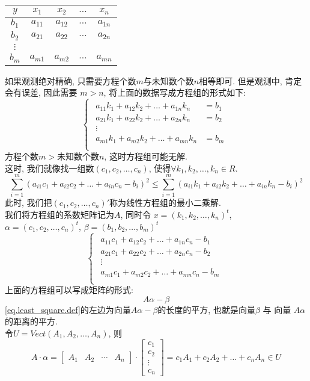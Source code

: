\documentclass{book}
\begin{document}
\begin{center}
\begin{tabular}{c|cccc}
$y$ & $x_1$ & $x_2$ & $\ldots$ & $x_n$ \\ \hline
$b_1$ & $a_{11}$ & $a_{12}$ & $\ldots$ & $a_{1n}$ \\
$b_2$ & $a_{21}$ & $a_{22}$ & $\ldots$ & $a_{2n}$ \\
		$\vdots$ \\
$b_m$ & $a_{m1}$ & $a_{m2}$ & $\ldots$ & $a_{mn}$
\end{tabular}
\end{center}
如果观测绝对精确, 只需要方程个数$m$与未知数个数$n$相等即可.
但是观测中, 肯定会有误差, 因此需要 $m > n$, 将上面的数据写成方程组的形式如下:
$$
\begin{cases}
\begin{aligned}
a_{11} k_1 + a_{12} k_2 + \ldots + a_{1n} k_n & = b_1 \\
a_{21} k_1 + a_{22} k_2 + \ldots + a_{2n} k_n & = b_2 \\
\vdots & \\
a_{m1} k_1 + a_{m2} k_2 + \ldots + a_{mn} k_n & = b_m \\
\end{aligned}
\end{cases}
$$
方程个数$m >$未知数个数$n$, 这时方程组可能无解. \\
这时, 我们就像找一组数$(c_1, c_2, \ldots, c_n)$, 使得$\forall k_1, k_2, \ldots, k_n \in R$.
\begin{equation}
\sum_{i = 1}^m (a_{i1} c_1 + a_{i2} c_2 + \ldots + a_{in} c_n - b_i)^2
\leq
\sum_{i = 1}^m (a_{i1} k_1 + a_{i2} k_2 + \ldots + a_{in} k_n - b_i)^2
\label{eq.least_square.def}
\end{equation}
此时, 我们把$(c_1, c_2, \ldots, c_n)'$称为线性方程组的最小二乘解. \\
我们将方程组的系数矩阵记为$A$, 同时令
$x = (k_1, k_2, \ldots, k_n)^t$,
$\alpha = (c_1, c_2, \ldots, c_n)^t$,
$\beta = (b_1, b_2, \ldots, b_m)^t$
$$
\begin{cases}
\begin{aligned}
a_{11} c_1 + a_{12} c_2 + \ldots + a_{1n} c_n - b_1 \\
a_{21} c_1 + a_{22} c_2 + \ldots + a_{2n} c_n - b_2 \\
\vdots \\
a_{m1} c_1 + a_{m2} c_2 + \ldots + a_{mn} c_n - b_m \\
\end{aligned}
\end{cases}
$$
上面的方程组可以写成矩阵的形式:
$$A \alpha - \beta$$
\eqref{eq.least_square.def}的左边为向量$A \alpha - \beta$的长度的平方, 也就是向量$\beta$ 与 向量 $A \alpha$的距离的平方. \\
令$U = Vect(A_1, A_2, \ldots, A_n)$, 则
$$
A \cdot \alpha
=
\begin{bmatrix}
A_1 & A_2 & \cdots & A_n
\end{bmatrix}
\cdot
\begin{bmatrix}
c_1 \\
c_2 \\
\vdots \\
c_n
\end{bmatrix}
= c_1 A_1 + c_2 A_2 + \ldots + c_n A_n \in U
$$
\end{document}
